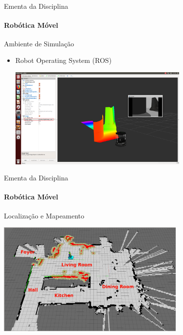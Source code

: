 \documentclass{beamer}
\begin{document}
\begin{frame}[t]{Ementa da Disciplina}
	\framesubtitle{Robótica Móvel}
	\begin{block}{Ambiente de Simulação}
	\end{block}

	\begin{itemize}
		\item  Robot Operating System (ROS)
		\begin{center}
			\includegraphics[width=0.7\textwidth]{./images/ros_example_2.png}	
		\end{center}
	\end{itemize}
\end{frame}



\begin{frame}[c]{Ementa da Disciplina}
	\framesubtitle{Robótica Móvel}
	\begin{block}{Localização e Mapeamento}
	\end{block}
	\begin{center}
		\includegraphics[width=0.7\textwidth]{./images/slam-example.png}	
	\end{center}
\end{frame}
\end{document}
